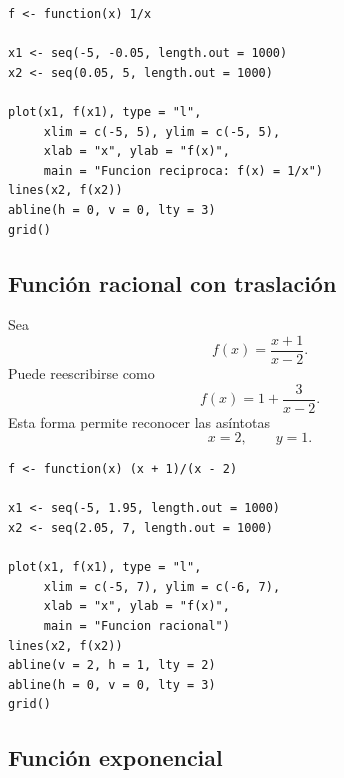 \documentclass[12pt]{article}
\theoremstyle{remark}
\begin{document}
\begin{verbatim}
f <- function(x) 1/x

x1 <- seq(-5, -0.05, length.out = 1000)
x2 <- seq(0.05, 5, length.out = 1000)

plot(x1, f(x1), type = "l",
     xlim = c(-5, 5), ylim = c(-5, 5),
     xlab = "x", ylab = "f(x)",
     main = "Funcion reciproca: f(x) = 1/x")
lines(x2, f(x2))
abline(h = 0, v = 0, lty = 3)
grid()
\end{verbatim}

\subsection{Función racional con traslación}

Sea
\[
f(x)=\frac{x+1}{x-2}.
\]
Puede reescribirse como
\[
f(x)=1+\frac{3}{x-2}.
\]
Esta forma permite reconocer las asíntotas
\[
x=2,\qquad y=1.
\]

\begin{center}
\end{center}

\begin{verbatim}
f <- function(x) (x + 1)/(x - 2)

x1 <- seq(-5, 1.95, length.out = 1000)
x2 <- seq(2.05, 7, length.out = 1000)

plot(x1, f(x1), type = "l",
     xlim = c(-5, 7), ylim = c(-6, 7),
     xlab = "x", ylab = "f(x)",
     main = "Funcion racional")
lines(x2, f(x2))
abline(v = 2, h = 1, lty = 2)
abline(h = 0, v = 0, lty = 3)
grid()
\end{verbatim}

\subsection{Función exponencial}
\end{document}
